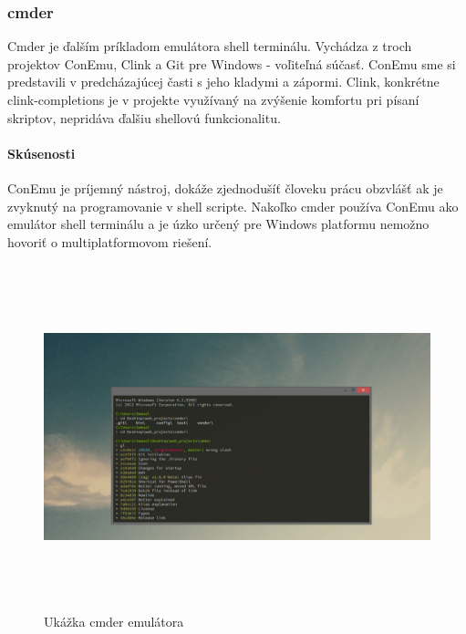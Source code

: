 \subsubsection{cmder}
\indent Cmder je ďalším príkladom emulátora shell terminálu. Vychádza z troch projektov ConEmu, Clink a Git pre Windows - voľiteľná súčasť. ConEmu sme si predstavili v predcházajúcej časti s jeho kladymi a zápormi. Clink, konkrétne clink-completions je v projekte využívaný na zvýšenie komfortu pri písaní skriptov, nepridáva ďalšiu shellovú funkcionalitu. 
\paragraph{Skúsenosti}
\indent ConEmu je príjemný nástroj, dokáže zjednodušíť človeku prácu obzvlášť ak je zvyknutý na programovanie v shell scripte. Nakoľko cmder používa ConEmu ako emulátor shell terminálu a je úzko určený pre Windows platformu nemožno hovoriť o multiplatformovom riešení.
\begin{figure}[!htbp]
	\centering
	\includegraphics[height=10cm]{img/cmder.jpg}
	\caption{Ukážka cmder emulátora}
	\label{fig:test}
\end{figure}
